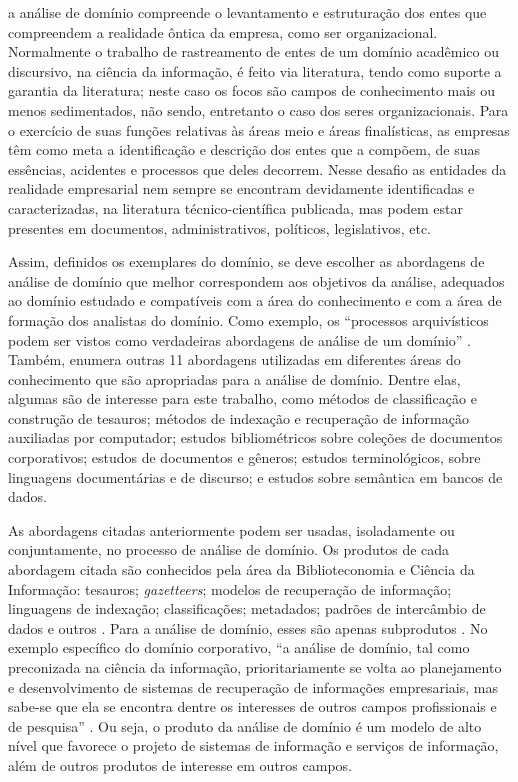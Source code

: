 \begin{citacao}
a análise de domínio compreende o levantamento e estruturação dos entes que compreendem a realidade ôntica da empresa, como ser organizacional. Normalmente o trabalho de rastreamento de entes de um domínio acadêmico ou discursivo, na ciência da informação, é feito via literatura, tendo como suporte a garantia da literatura; neste caso os focos são campos de conhecimento mais ou menos sedimentados, não sendo, entretanto o caso dos seres organizacionais. Para o exercício de suas funções relativas às áreas meio e áreas finalísticas, as empresas têm como meta a identificação e descrição dos entes que a compõem, de suas essências, acidentes e processos que deles decorrem. Nesse desafio as entidades da realidade empresarial nem sempre se encontram devidamente identificadas e caracterizadas, na literatura técnico-científica publicada, mas podem estar presentes em documentos, administrativos, políticos, legislativos, etc. \cite{alvarenga12}
\end{citacao}

Assim, definidos os exemplares do domínio, se deve escolher as abordagens de análise de domínio que melhor correspondem aos objetivos da análise, adequados ao domínio estudado e compatíveis com a área do conhecimento e com a área de formação dos analistas do domínio. Como exemplo, os ``processos arquivísticos podem ser vistos como verdadeiras abordagens de análise de um domínio'' \cite{alvarenga12}. Também,  enumera outras 11 abordagens utilizadas em diferentes áreas do conhecimento que são apropriadas para a análise de domínio. Dentre elas, algumas são de interesse para este trabalho, como métodos de classificação e construção de tesauros; métodos de indexação e recuperação de informação auxiliadas por computador; estudos bibliométricos sobre coleções de documentos corporativos; estudos de documentos e gêneros; estudos terminológicos, sobre linguagens documentárias e de discurso; e estudos sobre semântica em bancos de dados.

As abordagens citadas anteriormente podem ser usadas, isoladamente ou conjuntamente, no processo de análise de domínio. Os produtos de cada abordagem citada são conhecidos pela área da Biblioteconomia e Ciência da Informação: tesauros; \textit{gazetteers}; modelos de recuperação de informação; linguagens de indexação; classificações; metadados; padrões de intercâmbio de dados e outros \cite{lykke2011domain}. Para a análise de domínio, esses são apenas subprodutos \cite{albrechtsen1993subject}. No exemplo específico do domínio corporativo, ``a análise de domínio, tal como preconizada na ciência da informação, prioritariamente se volta ao planejamento e desenvolvimento de sistemas de recuperação de informações empresariais, mas sabe-se que ela se encontra dentre os interesses de outros campos profissionais e de pesquisa'' \cite{alvarenga12}. Ou seja, o produto da análise de domínio é um modelo de alto nível que favorece o projeto de sistemas de informação e serviços de informação, além de outros produtos de interesse em outros campos.

